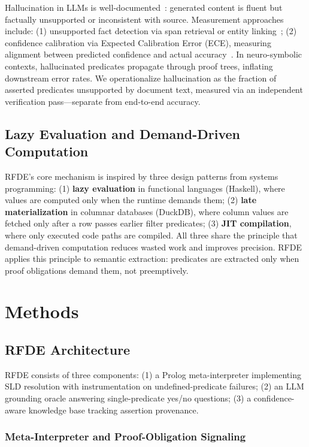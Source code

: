 \documentclass[11pt,letterpaper]{article}
\begin{document}
Hallucination in LLMs is well-documented~\citep{Li2024,Huang2023}: generated content is fluent but factually unsupported or inconsistent with source. Measurement approaches include: (1) unsupported fact detection via span retrieval or entity linking~\citep{Min2023}; (2) confidence calibration via Expected Calibration Error (ECE), measuring alignment between predicted confidence and actual accuracy~\citep{Guo2017}. In neuro-symbolic contexts, hallucinated predicates propagate through proof trees, inflating downstream error rates. We operationalize hallucination as the fraction of asserted predicates unsupported by document text, measured via an independent verification pass---separate from end-to-end accuracy.

\subsection{Lazy Evaluation and Demand-Driven Computation}

RFDE's core mechanism is inspired by three design patterns from systems programming: (1) \textbf{lazy evaluation} in functional languages (Haskell), where values are computed only when the runtime demands them; (2) \textbf{late materialization} in columnar databases (DuckDB), where column values are fetched only after a row passes earlier filter predicates; (3) \textbf{JIT compilation}, where only executed code paths are compiled. All three share the principle that demand-driven computation reduces wasted work and improves precision. RFDE applies this principle to semantic extraction: predicates are extracted only when proof obligations demand them, not preemptively.

\section{Methods}

\subsection{RFDE Architecture}

RFDE consists of three components: (1) a Prolog meta-interpreter implementing SLD resolution with instrumentation on undefined-predicate failures; (2) an LLM grounding oracle answering single-predicate yes/no questions; (3) a confidence-aware knowledge base tracking assertion provenance.

\subsubsection{Meta-Interpreter and Proof-Obligation Signaling}
\end{document}

